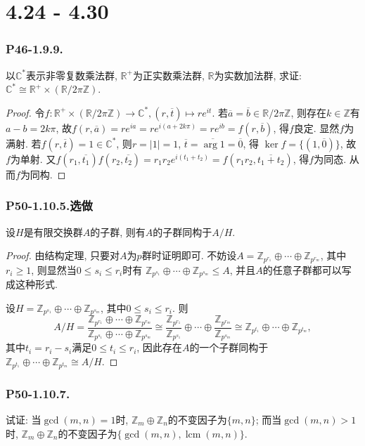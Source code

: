 \documentclass[12pt, a4paper, fontset=windows]{ctexart}
\newcommand{\C}{\mathbb{C}}
\newcommand{\R}{\mathbb{R}}
\newcommand{\Z}{\mathbb{Z}}
\newcommand{\abs}[1]{\left|{#1}\right|}
\newcommand{\cl}[1]{\overline{#1}} %
\newcommand{\isom}{\cong} %
\newcommand{\lcm}{\operatorname{lcm}}
\newcommand{\xuan}{{\normalsize 选做}}
\begin{document}
\part{4.24 - 4.30}

\section*{P46-1.9.9.}

以$\C^*$表示非零复数乘法群, $\R^+$为正实数乘法群, $\R$为实数加法群, 
求证: $\C^*\isom\R^+\times(\R/2\pi\Z)$. 

\begin{proof}
令$f:\R^+\times(\R/2\pi\Z)\to\C^*,(r,\cl{t})\mapsto re^{it}$. 
若$\cl{a}=\cl{b}\in\R/2\pi\Z$, 则存在$k\in\Z$有$a-b=2k\pi$, 
故$f(r,\cl{a})=re^{ia}=re^{i(a+2k\pi)}=re^{ib}=f(r,\cl{b})$, 
得$f$良定. 显然$f$为满射. 若$f(r,\cl{t})=1\in\C^*$, 
则$r=\abs{1}=1$, $\cl{t}=\cl{\arg 1}=\cl{0}$, 得
$\ker f=\{(1,\cl{0})\}$, 故$f$为单射. 
又$f(r_1,\cl{t_1})f(r_2,\cl{t_2})=r_1r_2e^{i(t_1+t_2)}=f(r_1r_2,\cl{t_1+t_2})$, 
得$f$为同态. 从而$f$为同构. 
\end{proof}

\section*{P50-1.10.5.\xuan}

设$H$是有限交换群$A$的子群, 则有$A$的子群同构于$A/H$. 

\begin{proof}
由结构定理, 只要对$A$为$p$群时证明即可. 
不妨设$A=\Z_{p^{r_1}}\oplus\cdots\oplus\Z_{p^{r_m}}$, 
其中$r_i\ge 1$, 则显然当$0\le s_i\le r_i$时有
$\Z_{p^{s_1}}\oplus\cdots\oplus\Z_{p^{s_m}}\le A$, 
并且$A$的任意子群都可以写成这种形式. 

设$H=\Z_{p^{s_1}}\oplus\cdots\oplus\Z_{p^{s_m}}$, 
其中$0\le s_i\le r_i$. 则
\[A/H=\frac{\Z_{p^{r_1}}\oplus\cdots\oplus\Z_{p^{r_m}}}{\Z_{p^{s_1}}\oplus\cdots\oplus\Z_{p^{s_m}}}
\isom\frac{\Z_{p^{r_1}}}{\Z_{p^{s_1}}}\oplus\cdots\oplus\frac{\Z_{p^{r_m}}}{\Z_{p^{s_m}}}
\isom\Z_{p^{t_1}}\oplus\cdots\oplus\Z_{p^{t_m}},\]
其中$t_i=r_i-s_i$满足$0\le t_i\le r_i$, 
因此存在$A$的一个子群同构于$\Z_{p^{t_1}}\oplus\cdots\oplus\Z_{p^{t_m}}\isom A/H$. 
\end{proof}

\section*{P50-1.10.7.}

试证: 当$\gcd(m,n)=1$时, $\Z_m\oplus\Z_n$的不变因子为$\{m,n\}$; 
而当$\gcd(m,n)>1$时, $\Z_m\oplus\Z_n$的不变因子为$\{\gcd(m,n),\lcm(m,n)\}$. 
\end{document}
